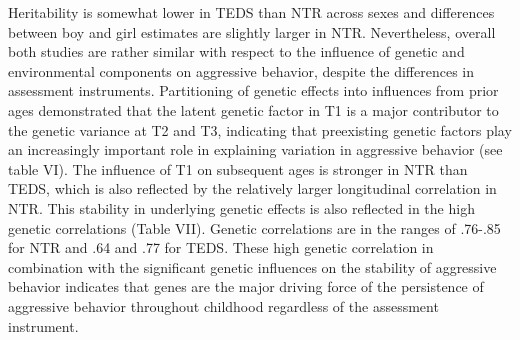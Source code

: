 Heritability is somewhat lower in TEDS than NTR across sexes and differences between boy and girl estimates are slightly larger in NTR.
Nevertheless, overall both studies are rather similar with respect to the influence of genetic and environmental components on aggressive behavior, despite the differences in assessment instruments.
Partitioning of genetic effects into influences from prior ages demonstrated that the latent genetic factor in T1 is a major contributor to the genetic variance at T2 and T3, indicating that preexisting genetic factors play an increasingly important role in explaining variation in aggressive behavior (see table VI).
The influence of T1 on subsequent ages is stronger in NTR than TEDS, which is also reflected by the relatively larger longitudinal correlation in NTR.
This stability in underlying genetic effects is also reflected in the high genetic correlations (Table VII).
Genetic correlations are in the ranges of .76-.85 for NTR and .64 and .77 for TEDS.
These high genetic correlation in combination with the significant genetic influences on the stability of aggressive behavior indicates that genes are the major driving force of the persistence of aggressive behavior throughout childhood regardless of the assessment instrument. 
